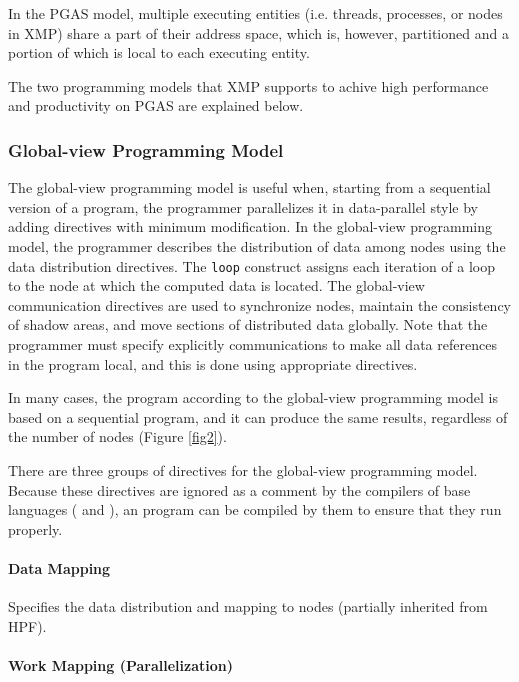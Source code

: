 In the PGAS model, multiple executing entities (i.e. threads, processes,
or nodes in XMP) share a part of their address space, which is, however,
partitioned and a portion of which is local to each executing entity.

The two programming models that XMP supports to achive high
performance and productivity on PGAS are explained below.

\subsubsection{Global-view Programming Model}

The global-view programming model is useful when, starting from a
sequential version of a program, the programmer parallelizes it in
data-parallel style by adding directives with minimum modification.
%
In the global-view programming model, the programmer describes the
distribution of data among nodes using the data distribution
directives.
%
The {\tt loop} construct assigns each iteration of a loop to the node
at which the computed data is located. 
%
The global-view communication directives are used to synchronize nodes,
maintain the consistency of shadow areas, and move sections of 
distributed data globally.
%
Note that the programmer must specify explicitly communications to make
all data references in the program local, and this is done using
appropriate directives.

In many cases, the {\XMP} program according to the global-view
programming model is based on a sequential program, and it can produce
the same results, regardless of the number of nodes (Figure
\ref{fig2}).

There are three groups of directives for the global-view programming
model. Because these directives are ignored as a comment by the
compilers of base languages ({\Fort} and {\C}), an {\XMP} program can be
compiled by them to ensure that they run properly.


\paragraph{Data Mapping}

Specifies the data distribution and mapping to nodes (partially
inherited from HPF).

\paragraph{Work Mapping (Parallelization)}

